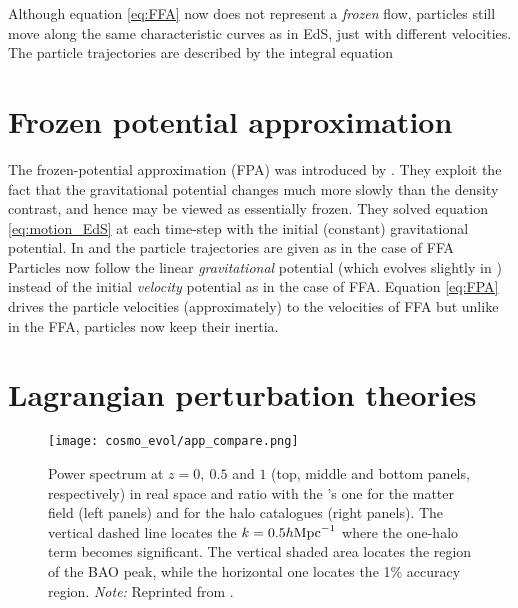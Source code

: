Although equation \eqref{eq:FFA} now does not represent a \textit{frozen} flow, particles still move along the same characteristic curves as in EdS, just with different velocities. The particle trajectories are described by the integral equation

\section{Frozen potential approximation}
The frozen-potential approximation (FPA) was introduced by \textcite{1994MNRAS.266..227B}. They exploit the fact that the gravitational potential changes much more slowly than the density contrast, and hence may be viewed as essentially frozen. They solved equation \eqref{eq:motion_EdS} at each time-step with the initial (constant) gravitational potential. In \LCDM
{}
and the particle trajectories are given as in the case of FFA\,
Particles now follow the linear \textit{gravitational} potential (which evolves slightly in \LCDM) instead of the initial \textit{velocity} potential as in the case of FFA. Equation \eqref{eq:FPA} drives the particle velocities (approximately) to the velocities of FFA but unlike in the FFA, particles now keep their inertia.



\section{Lagrangian perturbation theories}




\begin{figure}[ht]
    \centering
    \texttt{[image: cosmo\_evol/app\_compare.png]}
    \caption{Power spectrum at $z = 0,\ 0.5$ and $1$ (top, middle and bottom panels, respectively) in real space and ratio with the \nbody’s one for the matter field (left panels) and for the halo catalogues (right panels). The vertical dashed line locates the $k = 0.5h\text{Mpc}^{-1}$ where the one-halo term becomes significant. The vertical shaded area locates the region of the BAO peak, while the horizontal one locates the 1\% accuracy region.  \textit{Note:} Reprinted from \textcite{2017JCAP...07..050M}.}
    \label{fig:app_compare}
\end{figure}


